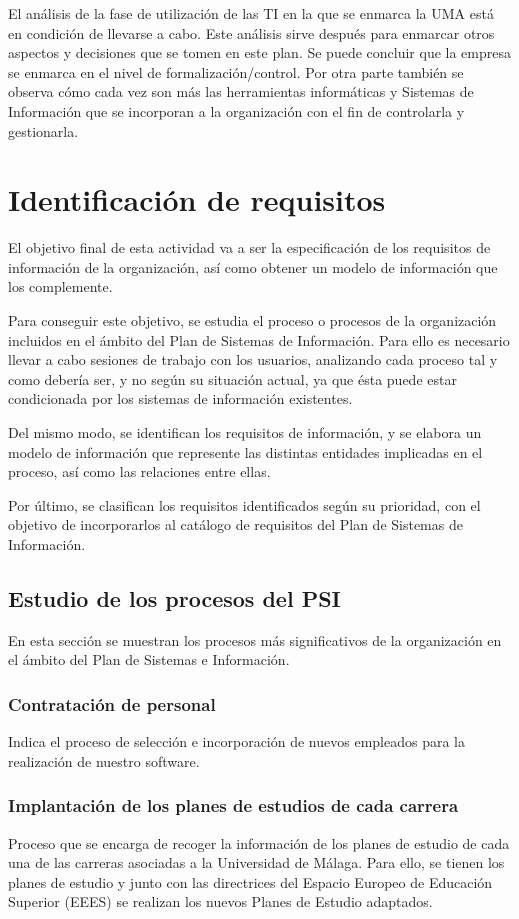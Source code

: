 \documentclass[11pt,a4paper,spanish,twoside]{book}
\begin{document}
El análisis de la fase de utilización de las TI en la que se enmarca la 
UMA está en condición de llevarse a cabo. Este análisis sirve después
para enmarcar otros aspectos y decisiones que se tomen en este plan. Se puede
concluir que la empresa se enmarca en el nivel de formalización/control. Por
otra parte también se observa cómo cada vez son más las herramientas
informáticas y Sistemas de Información que se incorporan a la organización
con el fin de controlarla y gestionarla. 

\chapter{Identificación de requisitos}
El objetivo final de esta actividad va a ser la especificación de los
requisitos de información de la organización, así como obtener un modelo de
información que los complemente.

Para conseguir este objetivo, se estudia el proceso o procesos de la
organización incluidos en el ámbito del Plan de Sistemas de Información. Para
ello es necesario llevar a cabo sesiones de trabajo con los usuarios,
analizando cada proceso tal y como debería ser, y no según su situación
actual, ya que ésta puede estar condicionada por los sistemas de información
existentes. 

Del mismo modo, se identifican los requisitos de información, y
se elabora un modelo de información que represente las distintas entidades
implicadas en el proceso, así como las relaciones entre ellas. 

Por último, se clasifican los requisitos identificados según su prioridad,
con el objetivo de incorporarlos al catálogo de requisitos del Plan de
Sistemas de Información. 

\section{Estudio de los procesos del PSI}
En esta sección se muestran los procesos más significativos de la
organización en el ámbito del Plan de Sistemas e Información.  
\subsection{Contratación de personal}
Indica el proceso de selección e incorporación de nuevos empleados para la
realización de nuestro software.
\subsection{Implantación de los planes de estudios de cada carrera}
Proceso que se encarga de recoger la información de los planes de estudio de
cada una de las carreras asociadas a la Universidad de Málaga. Para ello, se
tienen los planes de estudio y junto con las directrices del Espacio Europeo
de Educación Superior (EEES) se realizan los nuevos Planes de Estudio
adaptados.
\end{document}
